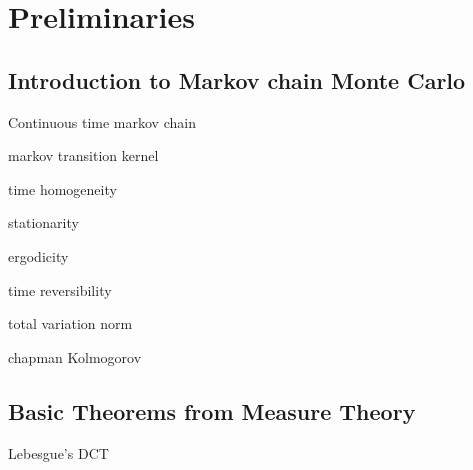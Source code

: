 \chapter{Preliminaries}
\section{Introduction to Markov chain Monte Carlo}
\begin{definition}
	Continuous time markov chain
\end{definition}
\begin{definition}
	markov transition kernel
\end{definition}
\begin{definition}
	time homogeneity
\end{definition}
\begin{definition}
	stationarity
\end{definition}
\begin{definition}
	ergodicity
\end{definition}
\begin{definition}
	time reversibility
\end{definition}
\begin{definition}
	total variation norm
\end{definition}
\begin{definition}
	chapman Kolmogorov
\end{definition}

\section{Basic Theorems from Measure Theory}
\begin{theorem}
	Lebesgue's DCT
\end{theorem}
